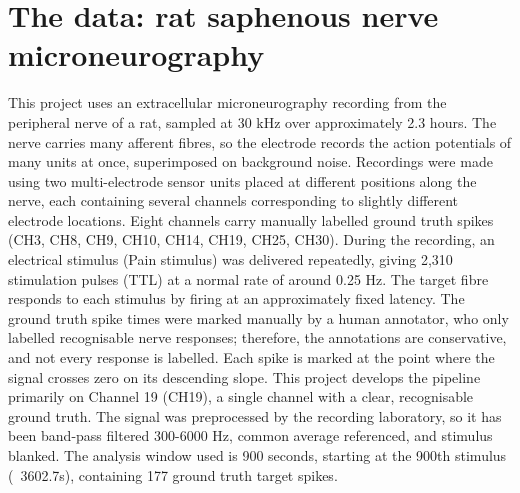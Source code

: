\documentclass[ %
                    author={Daniel Page},
                supervisor={Dr. Andrew Calway},
                    degree={MSc},
                     title={Some Structural Guidelines for Data Science MSc Theses, Including Those With Long Titles that Run Across Multiple Lines on the Front Page},
                  subtitle={And those including an optional subtitle too, for good measure},
                      type={},
                      year={2021}]{dissertation}
\begin{document}
\section{The data: rat saphenous nerve microneurography}
This project uses an extracellular microneurography recording from the peripheral nerve of a rat, sampled at 30 kHz over approximately 2.3 hours. The nerve carries many afferent fibres, so the electrode records the action potentials of many units at once, superimposed on background noise. 
Recordings were made using two multi-electrode sensor units placed at different positions along the nerve, each containing several channels corresponding to slightly different electrode locations. Eight channels carry manually labelled ground truth spikes (CH3, CH8, CH9, CH10, CH14, CH19, CH25, CH30). 
During the recording, an electrical stimulus (Pain stimulus) was delivered repeatedly, giving 2,310 stimulation pulses (TTL) at a normal rate of around 0.25 Hz. The target fibre responds to each stimulus by firing at an approximately fixed latency. The ground truth spike times were marked manually by a human annotator, who only labelled recognisable nerve responses; therefore, the annotations are conservative, and not every response is labelled. Each spike is marked at the point where the signal crosses zero on its descending slope. 
This project develops the pipeline primarily on Channel 19 (CH19), a single channel with a clear, recognisable ground truth. The signal was preprocessed by the recording laboratory, so it has been band-pass filtered 300-6000 Hz, common average referenced, and stimulus blanked. The analysis window used is 900 seconds, starting at the 900th stimulus (~3602.7s), containing 177 ground truth target spikes. 
\end{document}
